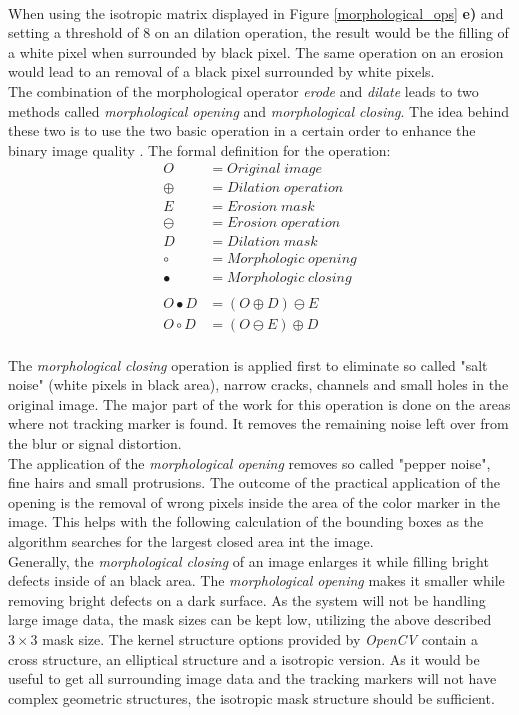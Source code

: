 \\When using the isotropic matrix displayed in Figure \ref{morphological_ops} \textbf{e)} and setting a threshold of 8 on an dilation operation, the result would be the filling of a white pixel when surrounded by black pixel. The same operation on an erosion would lead to an removal of a black pixel surrounded by white pixels.\\
The combination of the morphological operator \textit{erode} and \textit{dilate} leads to two methods called \textit{morphological opening} and \textit{morphological closing}. The idea behind these two is to use the two basic operation in a certain order to enhance the binary image quality \cite[chapter~3.12]{Davies.2017}.
The formal definition for the operation:
\begin{equation}
 \begin{split}
O&=Original\; image \\
\oplus&= Dilation\; operation\\
E&=Erosion\; mask\\
\ominus&= Erosion\; operation\\
D&=Dilation\; mask\\
\circ&= Morphologic\; opening\\
\bullet&= Morphologic\; closing\\
\\
O\bullet D&=(O\oplus D)\ominus E\\
O\circ D&=(O \ominus E)\oplus D\\
\end{split}
\end{equation}

The \textit{morphological closing} operation is applied first to eliminate so called "salt noise" (white pixels in black area), narrow cracks, channels and small holes in the original image. The major part of the work for this operation is done on the areas where not tracking marker is found. It removes the remaining noise left over from the blur or signal distortion.\\
The application of the \textit{morphological opening} removes so called "pepper noise", fine hairs and small protrusions. The outcome of the practical application of the opening is the removal of wrong pixels inside the area of the color marker in the image. This helps with the following calculation of the bounding boxes as the algorithm searches for the largest closed area int the image.\\
Generally, the\textit{ morphological closing} of an image enlarges it while filling bright defects inside of an black area. The \textit{morphological opening} makes it smaller while removing bright defects on a dark surface.
As the system will not be handling large image data, the mask sizes can be kept low, utilizing the above described $3\times 3$ mask size. The kernel structure options provided by \textit{OpenCV} contain a cross structure, an elliptical structure and a isotropic version. As it would be useful to get all surrounding image data and the tracking markers will not have complex geometric structures, the isotropic mask structure should be sufficient.

